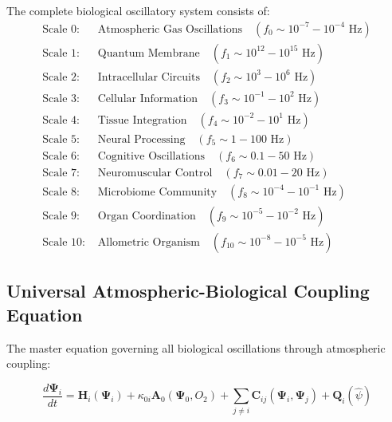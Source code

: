 \documentclass[twocolumn]{article}
\begin{document}
\begin{definition}
The complete biological oscillatory system consists of:
\begin{align}
\text{Scale 0: } &\text{Atmospheric Gas Oscillations} \quad (f_0 \sim 10^{-7}-10^{-4} \text{ Hz}) \label{eq:atmospheric} \\
\text{Scale 1: } &\text{Quantum Membrane} \quad (f_1 \sim 10^{12}-10^{15} \text{ Hz}) \label{eq:quantum_membrane} \\
\text{Scale 2: } &\text{Intracellular Circuits} \quad (f_2 \sim 10^3-10^6 \text{ Hz}) \label{eq:intracellular} \\
\text{Scale 3: } &\text{Cellular Information} \quad (f_3 \sim 10^{-1}-10^2 \text{ Hz}) \label{eq:cellular} \\
\text{Scale 4: } &\text{Tissue Integration} \quad (f_4 \sim 10^{-2}-10^1 \text{ Hz}) \label{eq:tissue} \\
\text{Scale 5: } &\text{Neural Processing} \quad (f_5 \sim 1-100 \text{ Hz}) \label{eq:neural} \\
\text{Scale 6: } &\text{Cognitive Oscillations} \quad (f_6 \sim 0.1-50 \text{ Hz}) \label{eq:cognitive} \\
\text{Scale 7: } &\text{Neuromuscular Control} \quad (f_7 \sim 0.01-20 \text{ Hz}) \label{eq:neuromuscular} \\
\text{Scale 8: } &\text{Microbiome Community} \quad (f_8 \sim 10^{-4}-10^{-1} \text{ Hz}) \label{eq:microbiome} \\
\text{Scale 9: } &\text{Organ Coordination} \quad (f_9 \sim 10^{-5}-10^{-2} \text{ Hz}) \label{eq:organ} \\
\text{Scale 10: } &\text{Allometric Organism} \quad (f_{10} \sim 10^{-8}-10^{-5} \text{ Hz}) \label{eq:allometric}
\end{align}
\end{definition}

\subsection{Universal Atmospheric-Biological Coupling Equation}

The master equation governing all biological oscillations through atmospheric coupling:

\begin{equation}
\frac{d\mathbf{\Psi}_i}{dt} = \mathbf{H}_i(\mathbf{\Psi}_i) + \kappa_{0i} \mathbf{A}_0(\mathbf{\Psi}_0, O_2) + \sum_{j \neq i} \mathbf{C}_{ij}(\mathbf{\Psi}_i, \mathbf{\Psi}_j) + \mathbf{Q}_i(\hat{\psi})
\label{eq:universal_atmospheric_coupling}
\end{equation}
\end{document}
